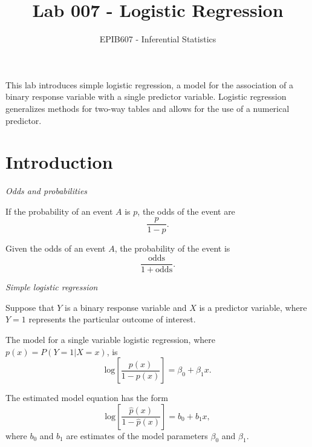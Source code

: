 \documentclass[letterpaper,12pt,twoside,]{pinp}
\title{Lab 007 - Logistic Regression}
\author[a]{EPIB607 - Inferential Statistics}
\affil[a]{Fall 2020, McGill University}
\begin{document}
\verticaladjustment{-2pt}

\maketitle
\thispagestyle{firststyle}



This lab introduces simple logistic regression, a model for the
association of a binary response variable with a single predictor
variable. Logistic regression generalizes methods for two-way tables and
allows for the use of a numerical predictor.

\hypertarget{introduction}{%
\section{Introduction}\label{introduction}}

\emph{Odds and probabilities}

If the probability of an event \(A\) is \(p\), the odds of the event are
\[\dfrac{p}{1 - p}. \]

Given the odds of an event \(A\), the probability of the event is
\[\dfrac{\text{odds}}{1 + \text{odds}}. \]

\emph{Simple logistic regression}

Suppose that \(Y\) is a binary response variable and \(X\) is a
predictor variable, where \(Y = 1\) represents the particular outcome of
interest.

The model for a single variable logistic regression, where
\(p(x) = P(Y = 1 | X = x)\), is
\[\text{log} \left[ \dfrac{p(x)}{1 - p(x)} \right] = \beta_0 + \beta_1 x.\]

The estimated model equation has the form
\[\text{log} \left[ \dfrac{\hat{p}(x)}{1 - \hat{p}(x)} \right] = b_0 + b_1 x, \]
where \(b_0\) and \(b_1\) are estimates of the model parameters
\(\beta_0\) and \(\beta_1\).
\end{document}
